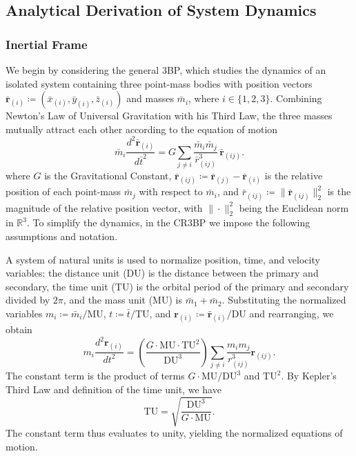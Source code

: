 \subsection{Analytical Derivation of System Dynamics} \label{subsec:dynamics_derivation}
\subsubsection{Inertial Frame}
We begin by considering the general 3BP, which studies the dynamics of an isolated system containing three point-mass bodies with position vectors $\bar{\boldsymbol{r}}_{(i)} \coloneq (\bar{x}_{(i)}, \bar{y}_{(i)}, \bar{z}_{(i)})$ and masses $\bar{m}_i$, where $i \in \{1,2,3\}$. Combining Newton's Law of Universal Gravitation with his Third Law, the three masses mutually attract each other according to the equation of motion
\begin{equation*}
    \bar{m}_i \frac{d^2 \bar{\boldsymbol{r}}_{(i)}}{d\bar{t}^2}
    = G \sum_{j\neq i}\frac{\bar{m}_i \bar{m}_j}{\bar{r}_{(ij)}^3}\,\bar{\boldsymbol{r}}_{(ij)}.
\end{equation*}
where $G$ is the Gravitational Constant, $\bar{\boldsymbol{r}}_{(ij)} \coloneq \bar{\boldsymbol{r}}_{(j)} - \bar{\boldsymbol{r}}_{(i)}$ is the relative position of each point-mass $\bar{m}_j$ with respect to $\bar{m}_i$, and $\bar{r}_{(ij)} \coloneq \|\bar{\boldsymbol{r}}_{(ij)}\|_2^2$ is the magnitude of the relative position vector, with $\|\cdot\|_2^2$ being the Euclidean norm in $\mathbb{R}^3$. To simplify the dynamics, in the CR3BP we impose the following assumptions and notation.

A system of natural units is used to normalize position, time, and velocity variables: the distance unit (DU) is the distance between the primary and secondary, the time unit (TU) is the orbital period of the primary and secondary divided by $2\pi$, and the mass unit (MU) is $\bar{m}_1+\bar{m}_2$. Substituting the normalized variables $m_i \coloneq \bar{m}_i / \mathrm{MU}$, $t \coloneq \bar{t}/\mathrm{TU}$, and $\boldsymbol{r}_{(i)} \coloneq \bar{\boldsymbol{r}}_{(i)}/\mathrm{DU}$ and rearranging, we obtain
\begin{equation*}
    m_i \frac{d^2\boldsymbol{r}_{(i)}}{dt^2} = \left( \frac{G \cdot \mathrm{MU} \cdot \mathrm{TU}^2}{\mathrm{DU}^3} \right) \sum_{j\neq i}\frac{m_i m_j}{r_{(ij)}^3}\boldsymbol{r}_{(ij)}.
\end{equation*}
The constant term is the product of terms $G \cdot \mathrm{MU}/\mathrm{DU}^3$ and $\mathrm{TU}^2$. By Kepler's Third Law and definition of the time unit, we have
\begin{equation*}
    \mathrm{TU} = \sqrt{\frac{\mathrm{DU}^3}{G \cdot \mathrm{MU}}}.
\end{equation*}
The constant term thus evaluates to unity, yielding the normalized equations of motion.

